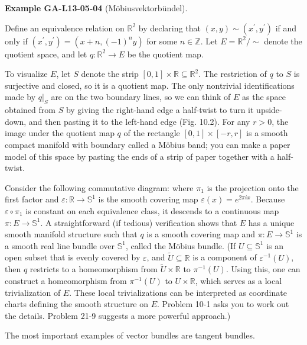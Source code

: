 \documentclass[10pt, letterpaper]{article}
\newcommand{\CustomHeading}[3]{%
  \par\medskip\noindent%
  \textbf{#1 #2} \textnormal{(#3)}.\enskip%
}
\newenvironment{EXA}[2]{\begin{unitbox}\CustomHeading{Example}{#1}{#2}}{\end{unitbox}}
\begin{document}
\begin{EXA}{GA-L13-05-04}{Möbiusvektorbündel}
Define an equivalence relation on $\mathbb{R}^2$ by declaring that $(x, y) \sim\left(x^{\prime}, y^{\prime}\right)$ if and only if $\left(x^{\prime}, y^{\prime}\right)=\left(x+n,(-1)^n y\right)$ for some $n \in \mathbb{Z}$. Let $E=\mathbb{R}^2 / \sim$ denote the quotient space, and let $q: \mathbb{R}^2 \rightarrow E$ be the quotient map.

To visualize $E$, let $S$ denote the strip $[0,1] \times \mathbb{R} \subseteq \mathbb{R}^2$. The restriction of $q$ to $S$ is surjective and closed, so it is a quotient map. The only nontrivial identifications made by $\left.q\right|_S$ are on the two boundary lines, so we can think of $E$ as the space obtained from $S$ by giving the right-hand edge a half-twist to turn it upside-down, and then pasting it to the left-hand edge (Fig. 10.2). For any $r>0$, the image under the quotient map $q$ of the rectangle $[0,1] \times[-r, r]$ is a smooth compact manifold with boundary called a Möbius band; you can make a paper model of this space by pasting the ends of a strip of paper together with a half-twist.

Consider the following commutative diagram:
where $\pi_1$ is the projection onto the first factor and $\varepsilon: \mathbb{R} \rightarrow \mathbb{S}^1$ is the smooth covering map $\varepsilon(x)=e^{2 \pi i x}$. Because $\varepsilon \circ \pi_1$ is constant on each equivalence class, it descends to a continuous map $\pi: E \rightarrow \mathbb{S}^1$. A straightforward (if tedious) verification shows that $E$ has a unique smooth manifold structure such that $q$ is a smooth covering map and $\pi: E \rightarrow \mathbb{S}^1$ is a smooth real line bundle over $\mathbb{S}^1$, called the Möbius bundle. (If $U \subseteq \mathbb{S}^1$ is an open subset that is evenly covered by $\varepsilon$, and $\widetilde{U} \subseteq \mathbb{R}$ is a component of $\varepsilon^{-1}(U)$, then $q$ restricts to a homeomorphism from $\tilde{U} \times \mathbb{R}$ to $\pi^{-1}(U)$. Using this, one can construct a homeomorphism from $\pi^{-1}(U)$ to $U \times \mathbb{R}$, which serves as a local trivialization of $E$. These local trivializations can be interpreted as coordinate charts defining the smooth structure on $E$. Problem 10-1 asks you to work out the details. Problem 21-9 suggests a more powerful approach.)
\end{EXA}



The most important examples of vector bundles are tangent bundles.
\end{document}
